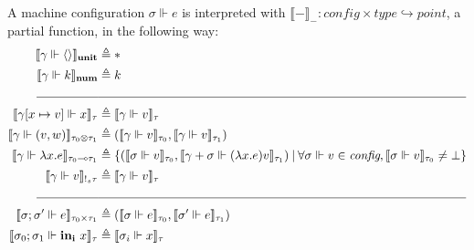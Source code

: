 \begin{definition}
  A machine configuration $\sigma \Vdash e$ is interpreted with $\llbracket -
  \rrbracket_{ - } : \textit{config} \times \textit{type} \hookrightarrow
  \textit{point}$, a partial function, in the following way:
  \begin{equation}
  \begin{aligned}[c]
  \llbracket \gamma \Vdash \langle \rangle \rrbracket_{\textbf{unit}}
    &\triangleq * \\
  \llbracket \gamma \Vdash k \rrbracket_{\textbf{num}} &\triangleq k \\
  \rule{5em}{0.4pt}&\rule{30em}{0.4pt}\\
  \llbracket \gamma [x \mapsto v] \Vdash x \rrbracket_{\tau} &\triangleq
    \llbracket \gamma \Vdash v \rrbracket_{\tau} \\
  \llbracket \gamma \Vdash (v, w) \rrbracket_{\tau_0 \otimes \tau_1} &\triangleq
    (\llbracket \gamma \Vdash v \rrbracket_{\tau_0}, \llbracket \gamma \Vdash v
    \rrbracket_{\tau_1}) \\
  \llbracket \gamma \Vdash \lambda x . e \rrbracket_{\tau_0 \multimap \tau_1}
    &\triangleq \{ (\llbracket \sigma \Vdash v \rrbracket_{\tau_0}, \llbracket
    \gamma + \sigma \Vdash (\lambda x . e) v \rrbracket_{\tau_1}) \> | \>
    \forall \sigma \Vdash v \in \textit{config}, \llbracket \sigma \Vdash v
    \rrbracket_{\tau_0} \not= \bot \} \\
  \llbracket \gamma \Vdash v \rrbracket_{!_s \tau} &\triangleq \llbracket \gamma
    \Vdash v \rrbracket_\tau \\
  \rule{5em}{0.4pt}&\rule{30em}{0.4pt}\\
  \llbracket \sigma; \sigma' \Vdash e \rrbracket_{\tau_0 \times \tau_1}
    &\triangleq (\llbracket \sigma \Vdash e \rrbracket_{\tau_0}, \llbracket
    \sigma' \Vdash e \rrbracket_{\tau_1}) \\
  \llbracket \sigma_0; \sigma_1 \Vdash \mathbf{in_i} \ x \rrbracket_{\tau}
    &\triangleq \llbracket \sigma_i \Vdash x \rrbracket_{\tau} \\

\end{aligned}
\end{equation}
\end{definition}
